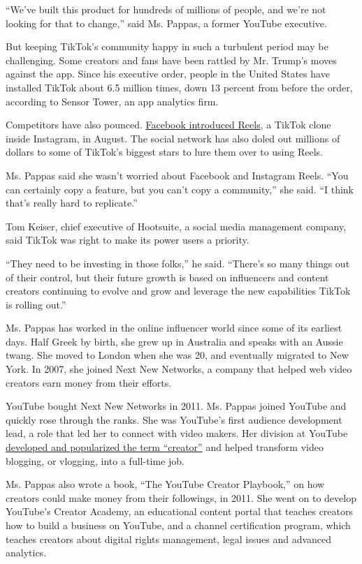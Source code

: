 ``We've built this product for hundreds of millions of people, and we're
not looking for that to change,'' said Ms. Pappas, a former YouTube
executive.

But keeping TikTok's community happy in such a turbulent period may be
challenging. Some creators and fans have been rattled by Mr. Trump's
moves against the app. Since his executive order, people in the United
States have installed TikTok about 6.5 million times, down 13 percent
from before the order, according to Sensor Tower, an app analytics firm.

Competitors have also pounced.
\href{https://www.nytimes3xbfgragh.onion/2020/08/05/technology/tiktok-facebook-instagram-reels.html}{Facebook
introduced Reels}, a TikTok clone inside Instagram, in August. The
social network has also doled out millions of dollars to some of
TikTok's biggest stars to lure them over to using Reels.

Ms. Pappas said she wasn't worried about Facebook and Instagram Reels.
``You can certainly copy a feature, but you can't copy a community,''
she said. ``I think that's really hard to replicate.''

Tom Keiser, chief executive of Hootsuite, a social media management
company, said TikTok was right to make its power users a priority.

``They need to be investing in those folks,'' he said. ``There's so many
things out of their control, but their future growth is based on
influencers and content creators continuing to evolve and grow and
leverage the new capabilities TikTok is rolling out.''

Ms. Pappas has worked in the online influencer world since some of its
earliest days. Half Greek by birth, she grew up in Australia and speaks
with an Aussie twang. She moved to London when she was 20, and
eventually migrated to New York. In 2007, she joined Next New Networks,
a company that helped web video creators earn money from their efforts.

YouTube bought Next New Networks in 2011. Ms. Pappas joined YouTube and
quickly rose through the ranks. She was YouTube's first audience
development lead, a role that led her to connect with video makers. Her
division at YouTube
\href{https://www.theatlantic.com/technology/archive/2019/05/how-creators-became-influencers/590725/}{developed
and popularized the term ``creator''} and helped transform video
blogging, or vlogging, into a full-time job.

Ms. Pappas also wrote a book, ``The YouTube Creator Playbook,'' on how
creators could make money from their followings, in 2011. She went on to
develop YouTube's Creator Academy, an educational content portal that
teaches creators how to build a business on YouTube, and a channel
certification program, which teaches creators about digital rights
management, legal issues and advanced analytics.

